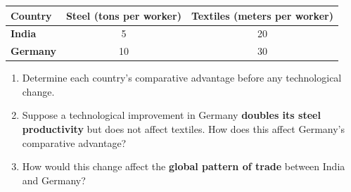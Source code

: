 \documentclass{article}
\begin{document}
\begin{table}[h]
    \centering
    \begin{tabular}{lcc}
        \toprule
        Country & Steel (tons per worker) & Textiles (meters per worker) \\
        \midrule
        \textbf{India} & 5 & 20 \\
        \textbf{Germany} & 10 & 30 \\
        \bottomrule
    \end{tabular}
\end{table}

\begin{enumerate}
    \item[(a)] Determine each country's comparative advantage before any technological change.
    \item[(b)] Suppose a technological improvement in Germany \textbf{doubles its steel productivity} but does not affect textiles. How does this affect Germany’s comparative advantage?
    \item[(c)] How would this change affect the \textbf{global pattern of trade} between India and Germany?
\end{enumerate}
\end{document}
